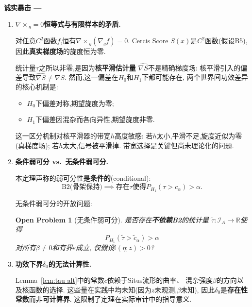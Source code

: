 \documentclass[12pt,a4paper]{article}
\newtheorem{openproblem}[theorem]{Open Problem}
\newenvironment{critique}{%
    \medskip\noindent
    {\bfseries\sffamily\color{red!60!black} 诚实暴击 --- }
    \itshape\small
}{\par\medskip}
\newcommand{\R}{\mathbb{R}}
\newcommand{\I}{\mathbb{I}}
\newcommand{\cI}{\mathcal{I}}
\newcommand{\curl}{\nabla\! \times\!}
\newcommand{\grad}{\nabla}
\begin{document}
\begin{critique}
\begin{enumerate}
        若B2不成立,非零旋度分量可能在Situs几何中不可见,
        统计量$\tau$可能完全失效.

        \item[(C3)] \textbf{$\curl_g = 0$恒等式与有限样本的矛盾.}

        对任意$C^2$函数$f$,恒有$\curl_g(\grad_g f) = 0$.
        Cercis Score $S(x)$是$C^2$函数(假设B5),
        因此\textbf{真实梯度场}的旋度恒为零.

        统计量$\tau$之所以非零,是因为\textbf{核平滑估计量}
        $\widehat{\nabla S}$不是精确梯度场:
        核平滑引入的偏差导致$\widehat{\nabla S} \neq \grad S$.
        然而,这一偏差在$H_0$和$H_1$下都可能存在,
        两个世界间功效差异的核心机制是:
        \begin{itemize}
            \item $H_0$下偏差对称,期望旋度为零;
            \item $H_1$下偏差因混杂而各向异性,期望旋度非零.
        \end{itemize}

        这一区分机制对核平滑器的带宽$h$高度敏感:
        若$h$太小,平滑不足,旋度近似为零(真梯度场);
        若$h$太大,信号被平滑掉.
        带宽选择是关键但尚未理论化的问题.

        \item[(C4)] \textbf{条件弱可分 vs.\ 无条件弱可分.}

        本定理声称的弱可分性是\textbf{条件的}(conditional):
        \begin{equation}
            \text{B2(骨架保持)} \implies \text{存在$\tau$使得$P_{H_1}(\tau > c_\alpha) > \alpha$}.
        \end{equation}

        无条件弱可分的开放问题:
        \begin{openproblem}[无条件弱可分]\label{prob:unconditional}
            是否存在\textbf{不依赖B2}的统计量
            $\tilde{\tau}: \cI_A \to \R$使得
            \begin{equation}
                P_{H_1}(\tilde{\tau} > \tilde{c}_\alpha) > \alpha
            \end{equation}
            对所有$\beta \neq 0$和有界$\varepsilon$成立,
            仅假设$\I(\eta; z) > 0$?
        \end{openproblem}

        \item[(C5)] \textbf{功效下界$\delta_0$的无法计算性.}

        Lemma~\ref{lem:tau-alt}中的常数$c$依赖于Situs流形的曲率、
        混杂强度$\beta$的方向以及核函数的选择.
        这些量在实践中均未知(因为$z$未观测,$\beta$未知),
        因此$\delta_0$是\textbf{存在性常数}而非\textbf{可计算界}.
        这限制了定理在实际审计中的指导意义.
    \end{enumerate}
\end{critique}
\end{document}
